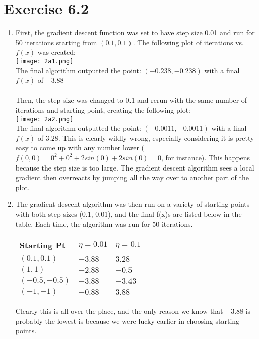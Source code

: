 \documentclass[12pt]{article}
\begin{document}
\section*{Exercise 6.2}
\begin{enumerate}[label=(\alph*)]
	\item First, the gradient descent function was set to have step size 0.01 and run for 50 iterations starting from $(0.1, 0.1)$. The following plot of iterations vs. $f(x)$ was created:
	\\ \texttt{[image: 2a1.png]}
	\\ The final algorithm outputted the point: $\boldsymbol{(-0.238, -0.238)}$ with a final $f(x)$ of $\boldsymbol{-3.88}$
	\\ \\ Then, the step size was changed to 0.1 and rerun with the same number of iterations and starting point, creating the following plot:
	\\ \texttt{[image: 2a2.png]}
	\\ The final algorithm outputted the point: $\boldsymbol{(-0.0011, -0.0011)}$ with a final $f(x)$ of $\boldsymbol{3.28}$. This is clearly wildly wrong, especially considering it is pretty easy to come up with any number lower ($f(0, 0) = 0^2 + 0^2 + 2 sin(0) + 2 sin(0) = 0$, for instance). This happens because the step size is too large. The gradient descent algorithm sees a local gradient then overreacts by jumping all the way over to another part of the plot.
	\item The gradient descent algorithm was then run on a variety of starting points with both step sizes (0.1, 0.01), and the final f(x)s are listed below in the table. Each time, the algorithm was run for 50 iterations.
	\begin{center}
		\begin{tabular}{| l | l | l |}
			\hline
			\textbf{Starting Pt} & $\eta = \boldsymbol{0.01}$ & $\eta = \boldsymbol{0.1}$ \\ \hline
			$(0.1, 0.1)$ & $-3.88$ & $3.28$ \\ \hline
			$(1, 1)$ & $-2.88$ & $-0.5$ \\ \hline
			$(-0.5, -0.5)$ & $-3.88$ & $-3.43$ \\ \hline
			$(-1, -1)$ & $-0.88$ & $3.88$ \\
			\hline
		\end{tabular}
	\end{center}
	Clearly this is all over the place, and the only reason we know that $-3.88$ is probably the lowest is because we were lucky earlier in choosing starting points.
\end{enumerate}
\end{document}
